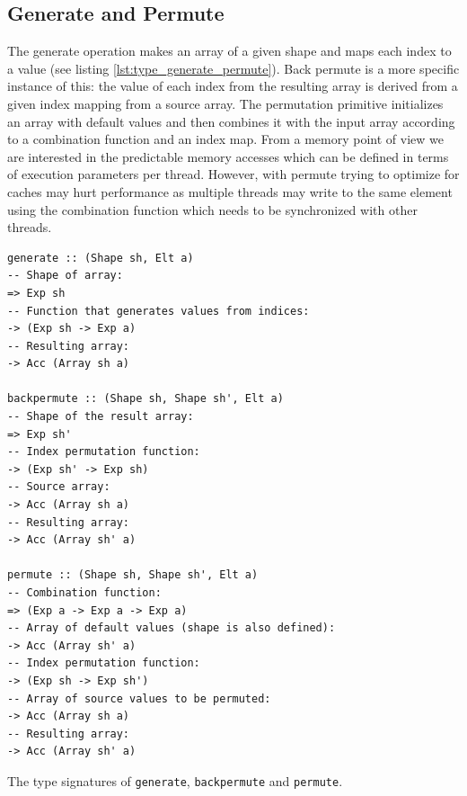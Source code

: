 \documentclass{article}
\begin{document}
\subsection{Generate and Permute}
The generate operation makes an array of a given shape and maps each index to a value (see listing \ref{lst:type_generate_permute}).
Back permute is a more specific instance of this: the value of each index from the resulting array is derived from a given index mapping from a source array.
The permutation primitive initializes an array with default values and then combines it with the input array according to a combination function and an index map.
From a memory point of view we are interested in the predictable memory accesses which can be defined in terms of execution parameters per thread.
However, with permute trying to optimize for caches may hurt performance as multiple threads may write to the same element using the combination function which needs to be synchronized with other threads.
\begin{listing}[!ht]
    \begin{verbatim}
generate :: (Shape sh, Elt a) 
-- Shape of array:
=> Exp sh 
-- Function that generates values from indices:
-> (Exp sh -> Exp a) 
-- Resulting array:
-> Acc (Array sh a) 

backpermute :: (Shape sh, Shape sh', Elt a)	 
-- Shape of the result array:
=> Exp sh'	
-- Index permutation function:
-> (Exp sh' -> Exp sh)	
-- Source array:
-> Acc (Array sh a)	
-- Resulting array:
-> Acc (Array sh' a)

permute :: (Shape sh, Shape sh', Elt a) 
-- Combination function:
=> (Exp a -> Exp a -> Exp a)	
-- Array of default values (shape is also defined):
-> Acc (Array sh' a)	
-- Index permutation function:
-> (Exp sh -> Exp sh')	
-- Array of source values to be permuted:
-> Acc (Array sh a)	
-- Resulting array:
-> Acc (Array sh' a)
    \end{verbatim}
    \caption{
        The type signatures of \texttt{generate}, \texttt{backpermute} and \texttt{permute}.
    }
    \label{lst:type_generate_permute}
\end{listing}
\end{document}
